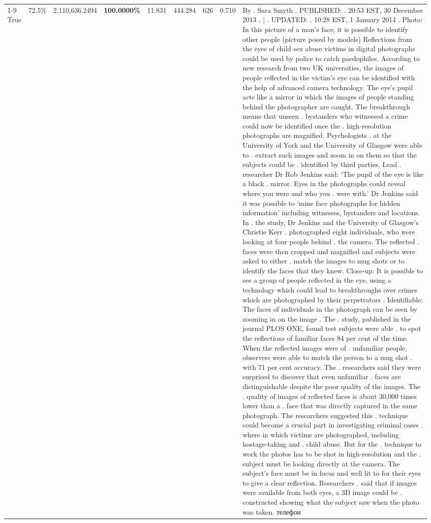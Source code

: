 \begin{table}[H]
\begin{tabular}{lllrlllll}
\cline{1-9}
True & 72.5\% & 2,110,636.2494 & \bfseries \color{red} 100.0000\% & 11.831 & 444.284 & 626 & 0.710 & By . Sara Smyth . PUBLISHED: . 20:53 EST, 30 December 2013 . | . UPDATED: . 10:28 EST, 1 January 2014 . Photo: In this picture of a man's face, it is possible to identify other people (picture posed by models) Reflections from the eyes of child sex abuse victims in digital photographs could be used by police to catch paedophiles. According to new research from two UK universities, the images of people reflected in the victim's eye can be identified with the help of advanced camera technology. The eye's pupil acts like a mirror in which the images of people standing behind the photographer are caught. The breakthrough means that unseen . bystanders who witnessed a crime could now be identified once the . high-resolution photographs are magnified. Psychologists . at the University of York and the University of Glasgow were able to . extract such images and zoom in on them so that the subjects could be . identified by third parties. Lead . researcher Dr Rob Jenkins said: ‘The pupil of the eye is like a black . mirror. Eyes in the photographs could reveal where you were and who you . were with.' Dr Jenkins said it was possible to ‘mine face photographs for hidden information' including witnesses, bystanders and locations. In . the study, Dr Jenkins and the University of Glasgow's Christie Kerr . photographed eight individuals, who were looking at four people behind . the camera. The reflected . faces were then cropped and magnified and subjects were asked to either . match the images to mug shots or to identify the faces that they knew. Close-up: It is possible to see a group of people reflected in the eye, using a technology which could lead to breakthroughs over crimes which are photographed by their perpetrators . Identifiable: The faces of individuals in the photograph can be seen by zooming in on the image . The . study, published in the journal PLOS ONE, found test subjects were able . to spot the reflections of familiar faces 84 per cent of the time. When the reflected images were of . unfamiliar people, observers were able to match the person to a mug shot . with 71 per cent accuracy. The . researchers said they were surprised to discover that even unfamiliar . faces are distinguishable despite the poor quality of the images. The . quality of images of reflected faces is about 30,000 times lower than a . face that was directly captured in the same photograph. The researchers suggested this . technique could become a crucial part in investigating criminal cases . where in which victims are photographed, including hostage-taking and . child abuse. But for the . technique to work the photos has to be shot in high-resolution and the . subject must be looking directly at the camera. The subject's face must be in focus and well lit to for their eyes to give a clear reflection. Researchers . said that if images were available from both eyes, a 3D image could be . constructed showing what the subject saw when the photo was taken. телефон \\

\end{tabular}
\end{table}
